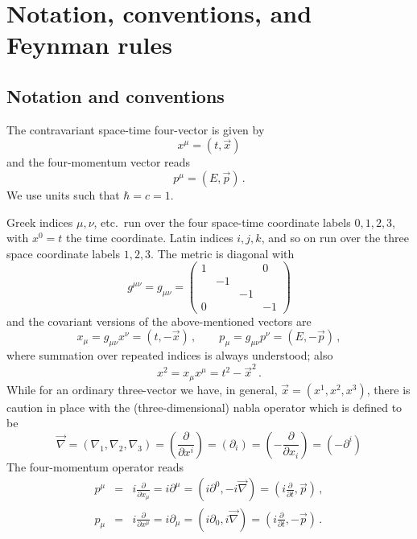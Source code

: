 \documentclass[sort&compress,preprint,3p]{elsarticle}
\begin{document}
\section{Notation, conventions, and Feynman rules}

\subsection{Notation and conventions}
The contravariant space-time four-vector is given by
\begin{equation}
	x^\mu = ( t, \vec x ) 
\end{equation}
and the four-momentum vector reads
\begin{equation}
	p^\mu = ( E, \vec p ) \, .
\end{equation}
We use units such that $\hbar=c=1$.

Greek indices $\mu, \nu$, etc.\ run over the four space-time
coordinate labels $0,1,2,3$, with $x^0=t$ the time coordinate.
Latin indices $i,j,k$, and so on run over the three space
coordinate labels $1,2,3$.
The metric is diagonal with
\begin{equation}
g^{\mu\nu}=g_{\mu\nu}=
\left( \begin{array}{cccc}1 & & &0\\ & -1 & & \\ & & -1 & \\0& & & -1\end{array}\right)
\end{equation}
and the covariant versions of the above-mentioned vectors are
\begin{equation}
	x_\mu = g_{\mu\nu} x^\nu = ( t, -\vec x ) \,, 
	\quad \quad
	p_\mu = g_{\mu\nu} p^\nu = ( E, -\vec p ) \,,
\end{equation}
where summation over repeated indices is always understood; also
\begin{equation}
x^2 = x_\mu x^\mu = t^2-{\vec x}^2 \,. 
\end{equation}
While for an ordinary three-vector we have, in general,
$\vec x=(x^1,x^2,x^3)$, there is caution in place with the
(three-dimensional) nabla operator which is defined to be
\begin{equation}
\vec \nabla = (\nabla_1,\nabla_2,\nabla_3)
= \left(\frac{\partial}{\partial x^i}\right)
= (\partial_i)
= \left(-\frac{\partial}{\partial x_i}\right)
= (-\partial^i)
\end{equation}
The four-momentum operator reads
\begin{eqnarray}
 p^\mu &=&
  i \frac{\partial}{\partial x_\mu} 
= i \partial^\mu 
= \left(i\partial^0,-i\vec \nabla \right)
= \left(i\frac{\partial}{\partial t},\vec p\right)
\,, \\
 p_\mu &=&
  i \frac{\partial}{\partial x^\mu} 
= i \partial_\mu 
= \left(i\partial_0,i\vec \nabla \right) 
= \left(i\frac{\partial}{\partial t},-\vec p\right) \,.
\end{eqnarray}
\end{document}
